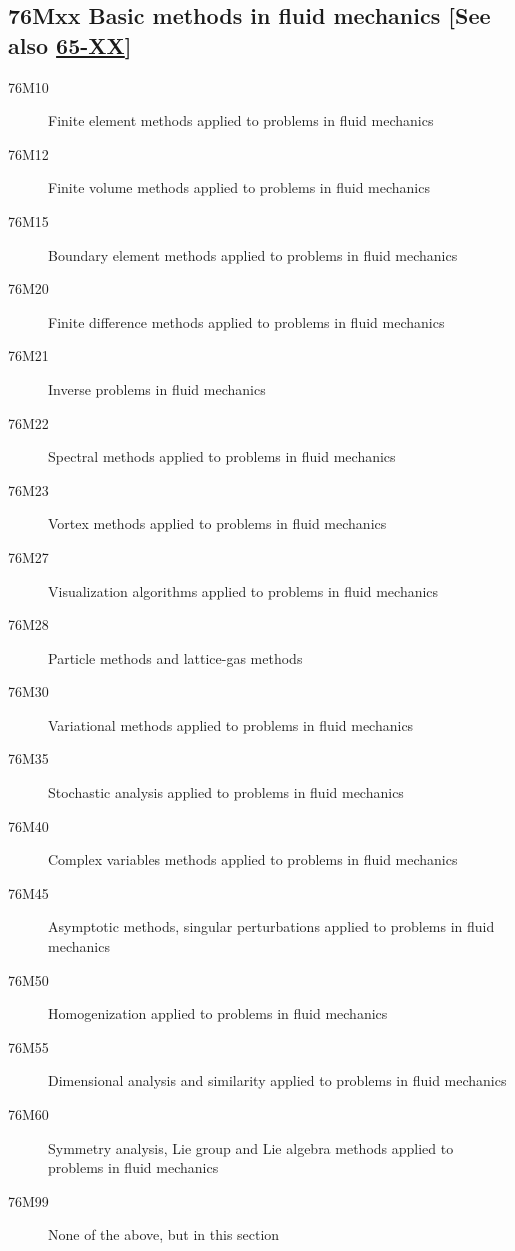 \subsection*{76Mxx  Basic methods in fluid mechanics [See also \hyperref[65-XX]{65-XX}] }\label{76Mxx}
\begin{description}  
\item [76M10]\label{76M10} Finite element methods applied to problems in fluid mechanics
\item [76M12]\label{76M12} Finite volume methods applied to problems in fluid mechanics
\item [76M15]\label{76M15} Boundary element methods applied to problems in fluid mechanics
\item [76M20]\label{76M20} Finite difference methods applied to problems in fluid mechanics
\item [76M21]\label{76M21} Inverse problems in fluid mechanics
\item [76M22]\label{76M22} Spectral methods applied to problems in fluid mechanics 
\item [76M23]\label{76M23} Vortex methods applied to problems in fluid mechanics
\item [76M27]\label{76M27} Visualization algorithms applied to problems in fluid mechanics
\item [76M28]\label{76M28} Particle methods and lattice-gas methods
\item [76M30]\label{76M30} Variational methods applied to problems in fluid mechanics
\item [76M35]\label{76M35} Stochastic analysis applied to problems in fluid mechanics
\item [76M40]\label{76M40} Complex variables methods applied to problems in fluid mechanics
\item [76M45]\label{76M45} Asymptotic methods, singular perturbations applied to problems in fluid mechanics
\item [76M50]\label{76M50} Homogenization applied to problems in fluid mechanics
\item [76M55]\label{76M55} Dimensional analysis and similarity applied to problems in fluid mechanics
\item [76M60]\label{76M60} Symmetry analysis, Lie group and Lie algebra methods applied to problems in fluid mechanics
\item [76M99]\label{76M99} None of the above, but in this section
\end{description}
